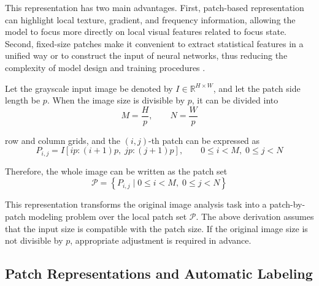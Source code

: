 \par This representation has two main advantages. First, patch-based
representation can highlight local texture, gradient, and frequency information,
allowing the model to focus more directly on local visual features related to
focus state. Second, fixed-size patches make it convenient to extract
statistical features in a unified way or to construct the input of neural
networks, thus reducing the complexity of model design and training procedures
\cite{Hou_2016_CVPR,dosovitskiy2020image}.

\par Let the grayscale input image be denoted by $I\in\mathbb{R}^{H\times W}$,
and let the patch side length be $p$. When the image size is divisible by $p$,
it can be divided into
\begin{equation}
    M=\frac{H}{p},\qquad N=\frac{W}{p}
    \label{eq:patch-grid}
\end{equation}
\par row and column grids, and the $(i,j)$-th patch can be expressed as
\begin{equation}
    P_{i,j}=I[ip:(i+1)p,\; jp:(j+1)p],\qquad
    0\le i<M,\; 0\le j<N
    \label{eq:patch-definition}
\end{equation}
\par Therefore, the whole image can be written as the patch set
\begin{equation}
    \mathcal{P}=\left\{P_{i,j}\mid 0\le i<M,\;0\le j<N\right\}
    \label{eq:patch-set}
\end{equation}
\par This representation transforms the original image analysis task into a
patch-by-patch modeling problem over the local patch set $\mathcal{P}$. The
above derivation assumes that the input size is compatible with the patch size.
If the original image size is not divisible by $p$, appropriate adjustment is
required in advance.

\subsection{Patch Representations and Automatic Labeling}
